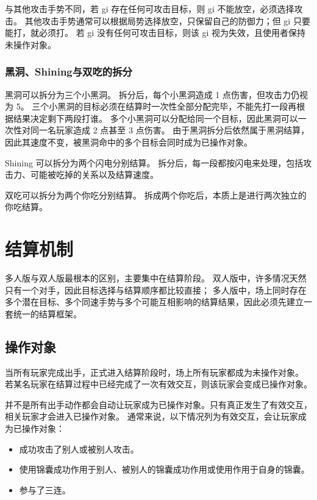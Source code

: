 \documentclass[12pt]{ctexart}
\begin{document}
与其他攻击手势不同，若 gi 存在任何可攻击目标，则 gi 不能放空，必须选择攻击。
其他攻击手势通常可以根据局势选择放空，只保留自己的防御力；但 gi 只要能打，就必须打。
若 gi 没有任何可攻击目标，则该 gi 视为失效，且使用者保持未操作对象。

\subsubsection{黑洞、Shining与双吃的拆分}

黑洞可以拆分为三个小黑洞。
拆分后，每个小黑洞造成 1 点伤害，但攻击力仍视为 5。
三个小黑洞的目标必须在结算时一次性全部分配完毕，不能先打一段再根据结果决定剩下两段打谁。
多个小黑洞可以分配给同一个目标，因此黑洞可以一次性对同一名玩家造成 2 点甚至 3 点伤害。
由于黑洞拆分后依然属于黑洞结算，因此其速度不变，被黑洞命中的多个目标会同时成为已操作对象。

Shining 可以拆分为两个闪电分别结算。
拆分后，每一段都按闪电来处理，包括攻击力、可能被吃掉的关系以及结算速度。

双吃可以拆分为两个你吃分别结算。
拆成两个你吃后，本质上是进行两次独立的你吃结算。

\section{结算机制}

多人版与双人版最根本的区别，主要集中在结算阶段。
双人版中，许多情况天然只有一个对手，因此目标选择与结算顺序都比较直接；
多人版中，场上同时存在多个潜在目标、多个同速手势与多个可能互相影响的结算结果，因此必须先建立一套统一的结算框架。

\subsection{操作对象}

当所有玩家完成出手，正式进入结算阶段时，场上所有玩家都成为未操作对象。
若某名玩家在结算过程中已经完成了一次有效交互，则该玩家会变成已操作对象。

并不是所有出手动作都会自动让玩家成为已操作对象。只有真正发生了有效交互，相关玩家才会进入已操作对象。
通常来说，以下情况列为有效交互，会让玩家成为已操作对象：

\begin{itemize}
    \item 成功攻击了别人或被别人攻击。
    \item 使用锦囊成功作用于别人、被别人的锦囊成功作用或使用作用于自身的锦囊。
    \item 参与了三连。
\end{itemize}
\end{document}

